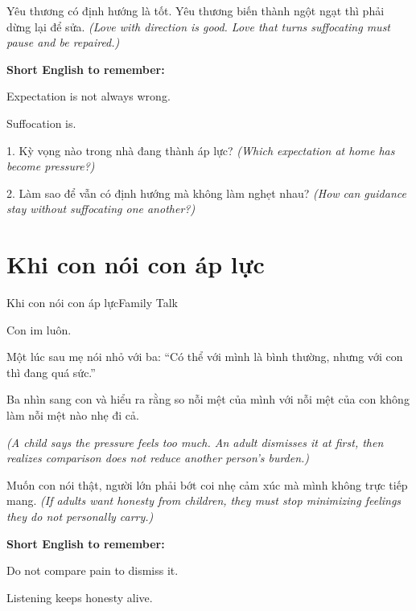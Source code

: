 \begin{baihoc}
Yêu thương có định hướng là tốt. Yêu thương biến thành ngột ngạt thì phải dừng lại để sửa.
\textit{(Love with direction is good. Love that turns suffocating must pause and be repaired.)}
\end{baihoc}

\begin{ghinhoanh}
\textbf{Short English to remember:}

Expectation is not always wrong.

Suffocation is.
\end{ghinhoanh}

\begin{tuhocnhanh}
1. Kỳ vọng nào trong nhà đang thành áp lực? \textit{(Which expectation at home has become pressure?)}

2. Làm sao để vẫn có định hướng mà không làm nghẹt nhau? \textit{(How can guidance stay without suffocating one another?)}
\end{tuhocnhanh}
\ngancach

\section{Khi con nói con áp lực}
\begin{truyen}{Khi con nói con áp lực}{Family Talk}

Con im luôn.

Một lúc sau mẹ nói nhỏ với ba: ``Có thể với mình là bình thường, nhưng với con thì đang quá sức.''

Ba nhìn sang con và hiểu ra rằng so nỗi mệt của mình với nỗi mệt của con không làm nỗi mệt nào nhẹ đi cả.

\textit{(A child says the pressure feels too much. An adult dismisses it at first, then realizes comparison does not reduce another person's burden.)}
\end{truyen}

\begin{baihoc}
Muốn con nói thật, người lớn phải bớt coi nhẹ cảm xúc mà mình không trực tiếp mang.
\textit{(If adults want honesty from children, they must stop minimizing feelings they do not personally carry.)}
\end{baihoc}

\begin{ghinhoanh}
\textbf{Short English to remember:}

Do not compare pain to dismiss it.

Listening keeps honesty alive.
\end{ghinhoanh}

